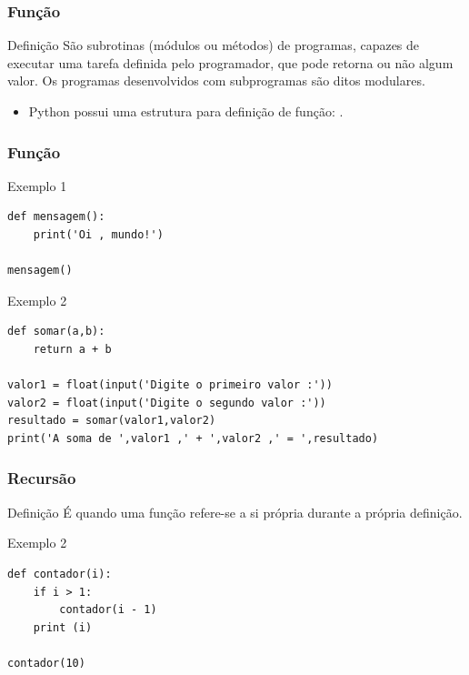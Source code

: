 \documentclass{beamer}
\begin{document}
\begin{frame}
\frametitle{Função}

\begin{block}{Definição}
São subrotinas (módulos ou métodos) de programas, capazes de executar uma tarefa definida pelo programador, que pode retorna ou não algum valor. Os programas desenvolvidos com subprogramas são ditos modulares.
\end{block} \vfill

\begin{itemize}
	\item Python possui uma estrutura para definição de função: .
\end{itemize}
\end{frame}

\begin{frame}[fragile]
\frametitle{Função}

\begin{exampleblock}{Exemplo 1}
	\begin{lstlisting}
def mensagem():
    print('Oi , mundo!')

mensagem()
	\end{lstlisting}
\end{exampleblock}\vfill

\begin{exampleblock}{Exemplo 2}
	\begin{lstlisting}
def somar(a,b):
    return a + b

valor1 = float(input('Digite o primeiro valor :'))
valor2 = float(input('Digite o segundo valor :'))
resultado = somar(valor1,valor2)
print('A soma de ',valor1 ,' + ',valor2 ,' = ',resultado)
	\end{lstlisting}
\end{exampleblock}
\end{frame}

\begin{frame}[fragile]
\frametitle{Recursão}

\begin{block}{Definição}
É quando uma função refere-se a si própria durante a própria definição.
\end{block} \vfill

\begin{exampleblock}{Exemplo 2}
\begin{lstlisting}
def contador(i):
    if i > 1:
        contador(i - 1)
    print (i)

contador(10)
\end{lstlisting}
\end{exampleblock}
\end{frame}
\end{document}
